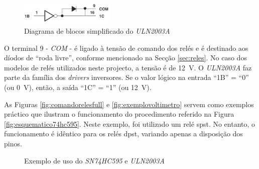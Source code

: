 \begin{figure}[hbtp]
	\centering
	\includegraphics[width=0.4\textwidth]{figures/uln2003_diagramablocos.png}
	\caption{Diagrama de blocos simplificado do \textit{ULN2003A}}
	\label{fig:diagramablocos2003}
\end{figure}

O terminal 9 - \textit{COM} - é ligado à tensão de comando dos relés e é destinado aos díodos de ``roda livre'', conforme mencionado na Secção \ref{sec:reles}. No caso dos modelos de relés utilizados neste projecto, a tensão é de \SI{12}{\volt}.
O \textit{ULN2003A} faz parte da família dos \textit{drivers} inversores. Se o valor lógico na entrada ``1B'' = ``0'' (ou \SI{0}{\volt}), então, a saída ``1C'' = ``1'' (ou \SI{12}{\volt}).

As Figuras \ref{fig:comandorelesfull} e \ref{fig:exemplovoltimetro} servem como exemplos práctico que ilustram o funcionamento do procedimento referido na Figura \ref{fig:esquematico74hc595}. Neste exemplo, foi utilizado um relé \acrshort{spst}. No entanto, o funcionamento é idêntico para os relés \acrshort{dpst}, variando apenas a disposição dos pinos.

\begin{figure}[hbtp]
	\centering%
		\centering
		\qquad
		\caption{Exemplo de uso do \textit{SN74HC595} e \textit{ULN2003A}}%
		\label{fig:ligacao5952003}%
	\end{figure}

